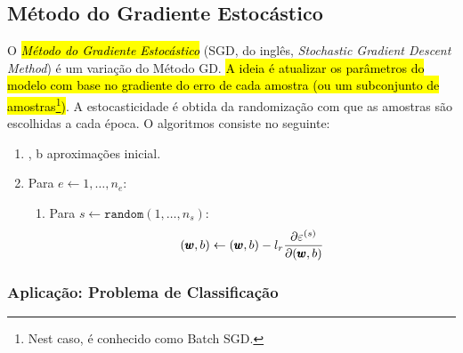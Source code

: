 \subsection{Método do Gradiente Estocástico}

O \hl{\emph{Método do Gradiente Estocástico}} (SGD, do inglês, \textit{Stochastic Gradient Descent Method}) é um variação do Método GD. \hl{A ideia é atualizar os parâmetros do modelo com base no gradiente do erro de cada amostra (ou um subconjunto de amostras\footnote{Nest caso, é conhecido como Batch SGD.})}. A estocasticidade é obtida da randomização com que as amostras são escolhidas a cada época. O algoritmos consiste no seguinte:
\begin{enumerate}[1.]
\item {}, b aproximações inicial.
\item Para $e\leftarrow 1,\dotsc, n_e$:
  \begin{enumerate}[1.1.]
  \item Para $s\leftarrow \texttt{random}(1,\dotsc, n_s)$:
    \begin{equation}
      (\pmb{w}, b) \leftarrow (\pmb{w}, b) - l_r\frac{\partial\varepsilon^{(s)}}{\partial(\pmb{w}, b)}
    \end{equation}
  \end{enumerate}
\end{enumerate}

\subsubsection{Aplicação: Problema de Classificação}


